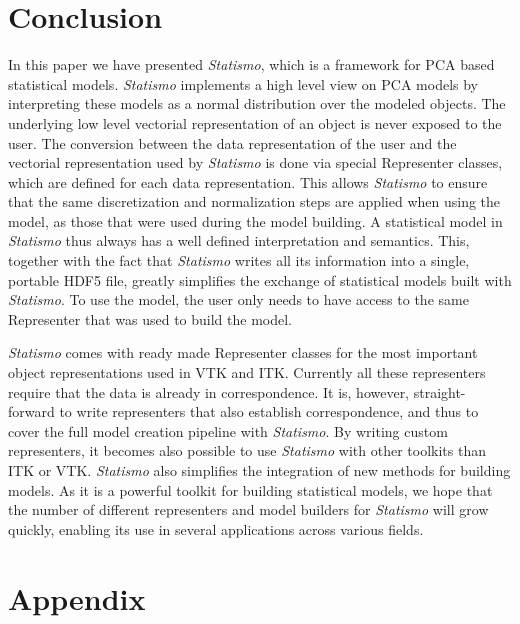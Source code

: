 \documentclass{InsightArticle}
\newcommand{\Statismo}{\emph{Statismo}\xspace}
\begin{document}
\section{Conclusion}
In this paper we have presented \Statismo, which is a framework for
PCA based statistical models.  \Statismo implements a high level view
on PCA models by interpreting these models as a normal distribution over
the modeled objects. The underlying low level vectorial representation
of an object is never exposed to the user.  The conversion between
the data representation of the user and the vectorial representation
used by \Statismo is done via special Representer classes, which are
defined for each data representation. This allows \Statismo to ensure
that the same discretization and normalization steps are applied when
using the model, as those that were used during the model building.  A
statistical model in \Statismo thus always has a well defined
interpretation and semantics.  This, together with the fact that
\Statismo writes all its information into a single, portable HDF5
file, greatly simplifies the exchange of statistical models built with \Statismo.
To use the model, the user only needs to have access to the same Representer that was used to build the model. 

\Statismo comes with ready made Representer classes for the most important object representations used in VTK and ITK. 
Currently all these representers require that the data is already in correspondence. It is, however, straight-forward to 
write representers that also establish correspondence, and thus to cover the full model creation pipeline with \Statismo.
By writing custom representers, it becomes also possible to use \Statismo with other toolkits than ITK or VTK. \Statismo
also simplifies the integration of new methods for building models.  As it is a powerful toolkit for building
statistical models, we hope that the number of different representers and model builders
for \Statismo will grow quickly, enabling its use in several applications across various fields.



\appendix
\section{Appendix}
\end{document}
